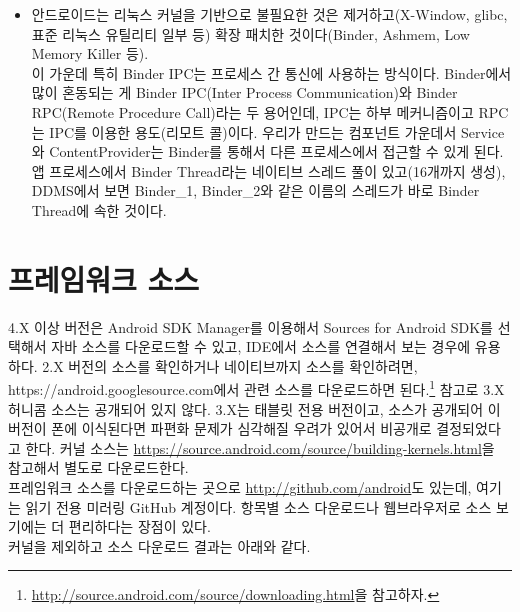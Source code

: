 \begin{itemize}
\item 안드로이드는 리눅스 커널을 기반으로 불필요한 것은 제거하고(X-Window, glibc, 표준 리눅스 유틸리티 일부 등) 확장 패치한 것이다(Binder, Ashmem, Low Memory Killer 등).\\

이 가운데 특히 Binder IPC는 프로세스 간 통신에 사용하는 방식이다. 
Binder에서 많이 혼동되는 게 Binder IPC(Inter Process Communication)와 Binder RPC(Remote Procedure Call)라는 두 용어인데, IPC는 하부 메커니즘이고 RPC는 IPC를 이용한 용도(리모트 콜)이다. 우리가 만드는 컴포넌트 가운데서 Service와 ContentProvider는 Binder를 통해서 다른 프로세스에서 접근할 수 있게 된다. 앱 프로세스에서 Binder Thread라는 네이티브 스레드 풀이 있고(16개까지 생성), DDMS에서 보면 Binder\_1, Binder\_2와 같은 이름의 스레드가 바로 Binder Thread에 속한 것이다. 

\end{itemize}
\section{프레임워크 소스}
4.X 이상 버전은 Android SDK Manager를 이용해서 Sources for Android SDK를 선택해서 자바 소스를 다운로드할 수 있고, IDE에서 소스를 연결해서 보는 경우에 유용하다. 
2.X 버전의 소스를 확인하거나 네이티브까지 소스를 확인하려면, https://android.googlesource.com에서 관련 소스를 다운로드하면 된다.\footnote{\url{http://source.android.com/source/downloading.html}을 참고하자.} 참고로 3.X 허니콤 소스는 공개되어 있지 않다. 
3.X는 태블릿 전용 버전이고, 소스가 공개되어 이 버전이 폰에 이식된다면 파편화 문제가 심각해질 우려가 있어서 비공개로 결정되었다고 한다.
커널 소스는 \url{https://source.android.com/source/building-kernels.html}을 참고해서 별도로 다운로드한다.\\
 
프레임워크 소스를 다운로드하는 곳으로 \url{http://github.com/android}도 있는데, 여기는 읽기 전용 미러링 GitHub 계정이다. 항목별 소스 다운로드나 웹브라우저로 소스 보기에는 더 편리하다는 장점이 있다.\\

커널을 제외하고 소스 다운로드 결과는 아래와 같다.

